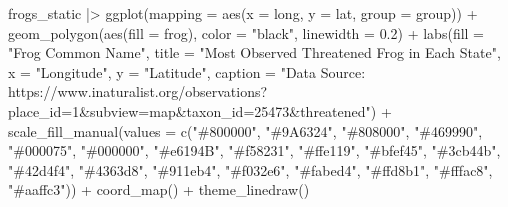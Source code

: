 \documentclass[
  letterpaper,
  DIV=11,
  numbers=noendperiod]{scrartcl}
\newenvironment{Shaded}{\begin{snugshade}}{\end{snugshade}}
\newcommand{\AttributeTok}[1]{\textcolor[rgb]{0.40,0.45,0.13}{#1}}
\newcommand{\FloatTok}[1]{\textcolor[rgb]{0.68,0.00,0.00}{#1}}
\newcommand{\FunctionTok}[1]{\textcolor[rgb]{0.28,0.35,0.67}{#1}}
\newcommand{\NormalTok}[1]{\textcolor[rgb]{0.00,0.23,0.31}{#1}}
\newcommand{\SpecialCharTok}[1]{\textcolor[rgb]{0.37,0.37,0.37}{#1}}
\newcommand{\StringTok}[1]{\textcolor[rgb]{0.13,0.47,0.30}{#1}}
\begin{document}
\begin{Shaded}
\begin{Highlighting}[]
\NormalTok{frogs\_static }\SpecialCharTok{|\textgreater{}}
  \FunctionTok{ggplot}\NormalTok{(}\AttributeTok{mapping =} \FunctionTok{aes}\NormalTok{(}\AttributeTok{x =}\NormalTok{ long, }\AttributeTok{y =}\NormalTok{ lat, }\AttributeTok{group =}\NormalTok{ group)) }\SpecialCharTok{+} 
  \FunctionTok{geom\_polygon}\NormalTok{(}\FunctionTok{aes}\NormalTok{(}\AttributeTok{fill =}\NormalTok{ frog), }\AttributeTok{color =} \StringTok{"black"}\NormalTok{, }\AttributeTok{linewidth =} \FloatTok{0.2}\NormalTok{) }\SpecialCharTok{+} 
  \FunctionTok{labs}\NormalTok{(}\AttributeTok{fill =} \StringTok{"Frog Common Name"}\NormalTok{, }\AttributeTok{title =} \StringTok{"Most Observed Threatened Frog in Each State"}\NormalTok{, }\AttributeTok{x =} \StringTok{"Longitude"}\NormalTok{, }\AttributeTok{y =} \StringTok{"Latitude"}\NormalTok{, }\AttributeTok{caption =} \StringTok{"Data Source: https://www.inaturalist.org/observations?place\_id=1\&subview=map\&taxon\_id=25473\&threatened"}\NormalTok{) }\SpecialCharTok{+}
  \FunctionTok{scale\_fill\_manual}\NormalTok{(}\AttributeTok{values =} \FunctionTok{c}\NormalTok{(}\StringTok{"\#800000"}\NormalTok{, }
                               \StringTok{"\#9A6324"}\NormalTok{, }
                               \StringTok{"\#808000"}\NormalTok{, }
                               \StringTok{"\#469990"}\NormalTok{, }
                               \StringTok{"\#000075"}\NormalTok{, }
                               \StringTok{"\#000000"}\NormalTok{, }
                               \StringTok{"\#e6194B"}\NormalTok{, }
                               \StringTok{"\#f58231"}\NormalTok{, }
                               \StringTok{"\#ffe119"}\NormalTok{, }
                               \StringTok{"\#bfef45"}\NormalTok{, }
                               \StringTok{"\#3cb44b"}\NormalTok{, }
                               \StringTok{"\#42d4f4"}\NormalTok{, }
                               \StringTok{"\#4363d8"}\NormalTok{,}
                               \StringTok{"\#911eb4"}\NormalTok{, }
                               \StringTok{"\#f032e6"}\NormalTok{, }
                               \StringTok{"\#fabed4"}\NormalTok{, }
                               \StringTok{"\#ffd8b1"}\NormalTok{,}
                               \StringTok{"\#fffac8"}\NormalTok{,}
                               \StringTok{"\#aaffc3"}\NormalTok{)) }\SpecialCharTok{+}
  \FunctionTok{coord\_map}\NormalTok{() }\SpecialCharTok{+}
  \FunctionTok{theme\_linedraw}\NormalTok{()}
\end{Highlighting}
\end{Shaded}
\end{document}
